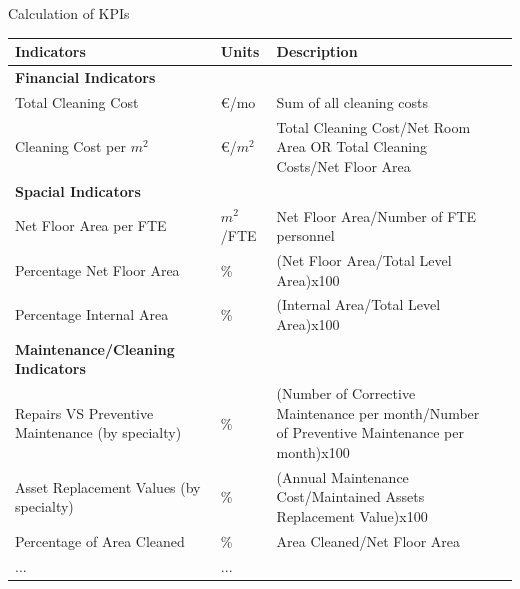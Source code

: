 
\begin{frame}{Calculation of KPIs}
	\resizebox{10cm}{!} {
	\begin{tabular}{llp{8cm}l}
		\hline
		 {\bf Indicators} &  {\bf Units} & {\bf Description} \\
		\hline
		{\bf Financial Indicators} & & \\
		Total Cleaning Cost 				& \euro/mo &  Sum of all cleaning costs \\
		Cleaning Cost per $m^2$ 			& \euro/$m^2$ &  Total Cleaning Cost/Net Room Area OR Total Cleaning Costs/Net Floor Area\\
		\hline
		{\bf Spacial Indicators} & & \\
		Net Floor Area per FTE				& $m^2$/FTE & Net Floor Area/Number of FTE personnel \\
		Percentage Net Floor Area 			& \% & (Net Floor Area/Total Level Area)x100 \\
		Percentage Internal Area			& \% & (Internal Area/Total Level Area)x100 \\
		\hline
		{\bf Maintenance/Cleaning Indicators} & & \\
		Repairs VS Preventive Maintenance (by specialty)						& \% & (Number of Corrective Maintenance per month/Number of Preventive Maintenance per month)x100 \\
		Asset Replacement Values (by specialty)												& \% & (Annual Maintenance Cost/Maintained Assets Replacement Value)x100\\
		Percentage of Area Cleaned 												& \% & Area Cleaned/Net Floor Area \\
		\hline
		... & ... & \\
	\end{tabular}
	}
\end{frame}

